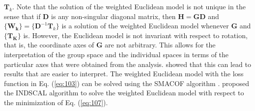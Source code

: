 $\mathbf{T}_k$. Note that the solution of the weighted Euclidean model
is not unique in the sense that if $\mathbf{D}$ is any non-singular
diagonal matrix, then $\mathbf{H} = \mathbf{G} \mathbf{D}$ and
$\{\mathbf{W_k}\} = \{\mathbf{D}^{-1} \mathbf{T}_k\}$ is a solution
of the weighted Euclidean model whenever $\mathbf{G}$ and
$\{\mathbf{T_K}\}$ is. However, the Euclidean model is not
invariant with respect to rotation, that is, the coordinate axes of
$\mathbf{G}$ are not arbitrary. This allows for the interpretation of
the group space and the individual spaces in terms of the particular
axes that were obtained from the
analysis. \citet{carroll70:_analy_n_eckar_young} showed that this can
lead to results that are easier to interpret. The weighted Euclidean
model with the loss function in Eq. (\ref{eq:103}) can be solved using
the SMACOF algorithm
\citep{leeuw80:_multiv,leeuw09:_multid_scalin_using_major}.
\citet{carroll70:_analy_n_eckar_young} proposed the INDSCAL algorithm
to solve the weighted Euclidean model with
respect to the minimization of Eq. (\ref{eq:107}). \\ \\

